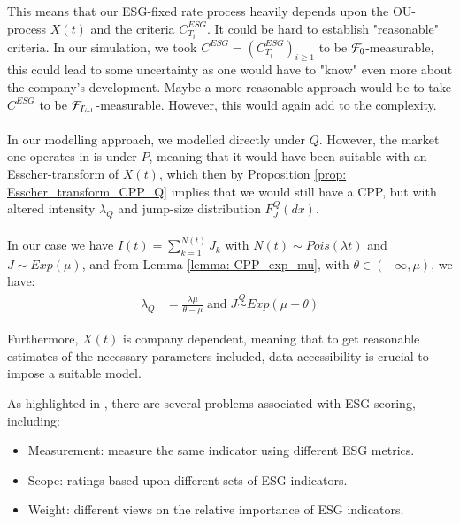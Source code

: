 This means that our ESG-fixed rate process heavily depends upon the OU-process $X(t)$ and the criteria $C_{T_{i}}^{ESG}$. It could be hard to establish "reasonable" criteria. In our simulation, we took $C^{ESG} = (C_{T_{i}}^{ESG})_{i\geq 1}$ to be $\mathcal{F}_{0}$-measurable, this could lead to some uncertainty as one would have to "know" even more about the company's development. Maybe a more reasonable approach would be to take $C^{ESG}$ to be $\mathcal{F}_{T_{i-1}}$-measurable. 
However, this would again add to the complexity.   
\\~\\ 
In our modelling approach, we modelled directly under $Q$. However, the market one operates in is under $P$, meaning that it would have been suitable with an Esscher-transform of $X(t)$, which then by  Proposition \ref{prop: Esscher_transform_CPP_Q} implies that we would still have a CPP, but with altered intensity $\lambda_{Q}$ and jump-size distribution $F_{J}^{Q}(dx)$.
\\~\\
In our case we have $I(t) = \sum_{k=1}^{N(t)}J_{k}$ with $N(t) \sim Pois(\lambda t)$ and 
$J\sim Exp(\mu)$, and from Lemma \ref{lemma: CPP_exp_mu}, with $\theta \in (-\infty, \mu)$, we have:
\begin{align*}
\lambda_{Q} &= \frac{\lambda \mu}{\theta - \mu} \;\text{and}\;
J \stackrel{Q}{\sim} Exp(\mu - \theta)
\end{align*}

Furthermore, $X(t)$ is company dependent, meaning that to get reasonable estimates of the necessary parameters included, data accessibility is crucial to impose a suitable model. 

\newpage 

As highlighted in \cite{berg2022aggregate}, there are several problems associated with ESG scoring, including: 
\begin{itemize}
    \item Measurement: measure the same indicator using different ESG metrics. 
    \item Scope: ratings based upon different sets of ESG indicators. 
    \item Weight: different views on the relative importance of ESG indicators. 
\end{itemize}

